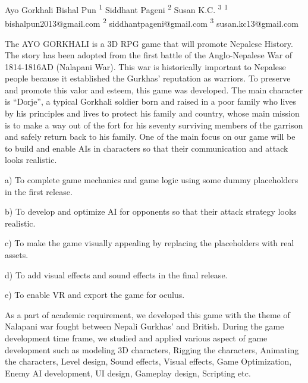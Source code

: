  \begin{conf-abstract}[]
 {Ayo Gorkhali }
 {Bishal Pun \textsuperscript{1}
 	Siddhant Pageni \textsuperscript{2}
 	Susan K.C. \textsuperscript{3}
 }
{\textsuperscript{1} bishalpun2013@gmail.com 
	\textsuperscript{2} siddhantpageni@gmail.com 
	\textsuperscript{3} susan.kc13@gmail.com}

The AYO GORKHALI is a 3D RPG game that will promote Nepalese History. The story has been adopted from the first battle of the Anglo-Nepalese War of 1814-1816AD (Nalapani War). This war is historically important to Nepalese people because it established the Gurkhas’ reputation as warriors. To preserve and promote this valor and esteem, this game was developed. The main character is “Dorje”, a typical Gorkhali soldier born and raised in a poor family who lives by his principles and lives to protect his family and country, whose main mission is to make a way out of the fort for his seventy surviving members of the garrison and safely return back to his family. One of the main focus on our game will be to build and enable AIs in characters so that their communication and attack looks realistic.

a)	To complete game mechanics and game logic using some dummy placeholders in the first release.

b)	To develop and optimize AI for opponents so that their attack strategy looks realistic.

c)	To make the game visually appealing by replacing the placeholders with real assets.

d)	To add visual effects and sound effects in the final release.

e)	To enable VR and export the game for oculus.

As a part of academic requirement, we developed this game with the theme of Nalapani war fought between Nepali Gurkhas' and British. During the game development time frame, we studied and applied various aspect of game development such as modeling 3D characters, Rigging the characters, Animating the characters, Level design, Sound effects, Visual effects, Game Optimization, Enemy AI development, UI design, Gameplay design, Scripting etc. 

 \end{conf-abstract}